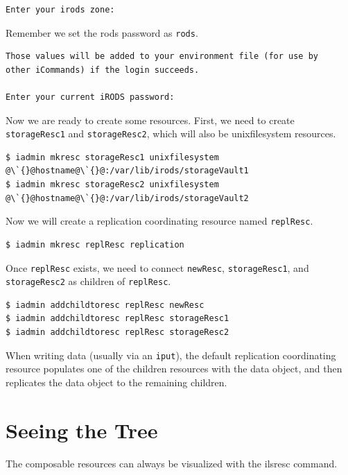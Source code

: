 \documentclass[10pt,oneside]{memoir}
\begin{document}
\begin{lstlisting}[basicstyle=\scriptsize\ttfamily]
Enter your irods zone:
\end{lstlisting}

\newpage

Remember we set the rods password as \texttt{rods}.

\begin{lstlisting}[basicstyle=\scriptsize\ttfamily]
Those values will be added to your environment file (for use by
other iCommands) if the login succeeds.

Enter your current iRODS password:
\end{lstlisting}

Now we are ready to create some resources. First, we need to create \texttt{storageResc1} and \texttt{storageResc2}, which will also be unixfilesystem resources.

\begin{lstlisting}[basicstyle=\scriptsize\ttfamily]
$ iadmin mkresc storageResc1 unixfilesystem @\`{}@hostname@\`{}@:/var/lib/irods/storageVault1
$ iadmin mkresc storageResc2 unixfilesystem @\`{}@hostname@\`{}@:/var/lib/irods/storageVault2
\end{lstlisting}

Now we will create a replication coordinating resource named \texttt{replResc}.

\begin{lstlisting}
$ iadmin mkresc replResc replication
\end{lstlisting}

Once \texttt{replResc} exists, we need to connect \texttt{newResc}, \texttt{storageResc1}, and \texttt{storageResc2} as children of \texttt{replResc}.

\begin{lstlisting}
$ iadmin addchildtoresc replResc newResc
$ iadmin addchildtoresc replResc storageResc1
$ iadmin addchildtoresc replResc storageResc2
\end{lstlisting}

When writing data (usually via an \texttt{iput}), the default replication coordinating resource populates one of the children resources with the data object, and then replicates the data object to the remaining children.

\section{Seeing the Tree}

The composable resources can always be visualized with the ilsresc command.
\end{document}
